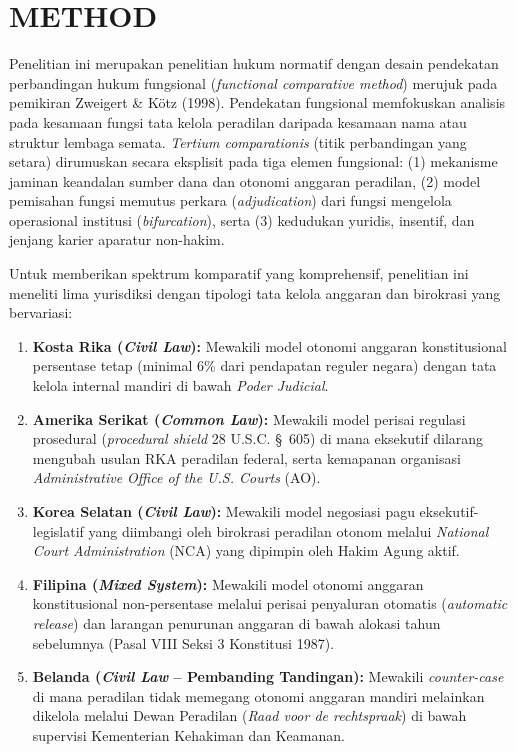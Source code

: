 \documentclass[12pt, a4paper]{article}
\begin{document}
\section{METHOD}

Penelitian ini merupakan penelitian hukum normatif dengan desain pendekatan perbandingan hukum fungsional (\textit{functional comparative method}) merujuk pada pemikiran Zweigert \& Kötz (1998). Pendekatan fungsional memfokuskan analisis pada kesamaan fungsi tata kelola peradilan daripada kesamaan nama atau struktur lembaga semata. \textit{Tertium comparationis} (titik perbandingan yang setara) dirumuskan secara eksplisit pada tiga elemen fungsional: (1) mekanisme jaminan keandalan sumber dana dan otonomi anggaran peradilan, (2) model pemisahan fungsi memutus perkara (\textit{adjudication}) dari fungsi mengelola operasional institusi (\textit{bifurcation}), serta (3) kedudukan yuridis, insentif, dan jenjang karier aparatur non-hakim.

Untuk memberikan spektrum komparatif yang komprehensif, penelitian ini meneliti lima yurisdiksi dengan tipologi tata kelola anggaran dan birokrasi yang bervariasi:
\begin{enumerate}
    \item \textbf{Kosta Rika (\textit{Civil Law}):} Mewakili model otonomi anggaran konstitusional persentase tetap (minimal 6\% dari pendapatan reguler negara) dengan tata kelola internal mandiri di bawah \textit{Poder Judicial}.
    \item \textbf{Amerika Serikat (\textit{Common Law}):} Mewakili model perisai regulasi prosedural (\textit{procedural shield} 28 U.S.C. \S~605) di mana eksekutif dilarang mengubah usulan RKA peradilan federal, serta kemapanan organisasi \textit{Administrative Office of the U.S. Courts} (AO).
    \item \textbf{Korea Selatan (\textit{Civil Law}):} Mewakili model negosiasi pagu eksekutif-legislatif yang diimbangi oleh birokrasi peradilan otonom melalui \textit{National Court Administration} (NCA) yang dipimpin oleh Hakim Agung aktif.
    \item \textbf{Filipina (\textit{Mixed System}):} Mewakili model otonomi anggaran konstitusional non-persentase melalui perisai penyaluran otomatis (\textit{automatic release}) dan larangan penurunan anggaran di bawah alokasi tahun sebelumnya (Pasal VIII Seksi 3 Konstitusi 1987).
    \item \textbf{Belanda (\textit{Civil Law} -- Pembanding Tandingan):} Mewakili \textit{counter-case} di mana peradilan tidak memegang otonomi anggaran mandiri melainkan dikelola melalui Dewan Peradilan (\textit{Raad voor de rechtspraak}) di bawah supervisi Kementerian Kehakiman dan Keamanan.
\end{enumerate}
\end{document}
